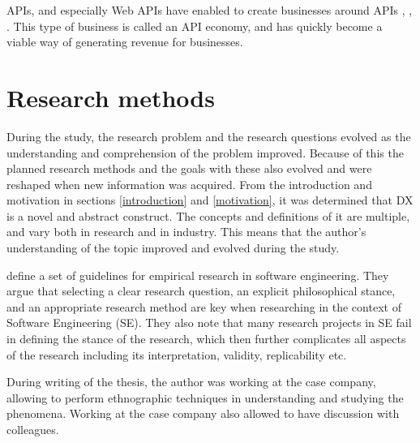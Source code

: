 \documentclass[english, 12pt, a4paper, sci, utf8, a-1b, online]{aaltothesis}
\begin{document}
APIs, and especially Web APIs have enabled to create businesses around APIs \citep{api-ecosystem}, \citep{web-api-economy}, \citep{moilanen2018api}. This type of business is called an API economy, and has quickly become a viable way of generating revenue for businesses.

\clearpage
\section{Research methods}

During the study, the research problem and the research questions evolved as the understanding and comprehension of the problem improved. Because of this the planned research methods and the goals with these also evolved and were reshaped when new information was acquired. From the introduction and motivation in sections \ref{introduction} and \ref{motivation}, it was determined that DX is a novel and abstract construct. The concepts and definitions of it are multiple, and vary both in research and in industry. This means that the author's understanding of the topic improved and evolved during the study.

\cite{easterbrook2008selecting} define a set of guidelines for empirical research in software engineering. They argue that selecting a clear research question, an explicit philosophical stance, and an appropriate research method are key when researching in the context of Software Engineering (SE). They also note that many research projects in SE fail in defining the stance of the research, which then further complicates all aspects of the research including its interpretation, validity, replicability etc.

During writing of the thesis, the author was working at the case company, allowing to perform ethnographic techniques in understanding and studying the phenomena. Working at the case company also allowed to have discussion with colleagues.


\end{document}
